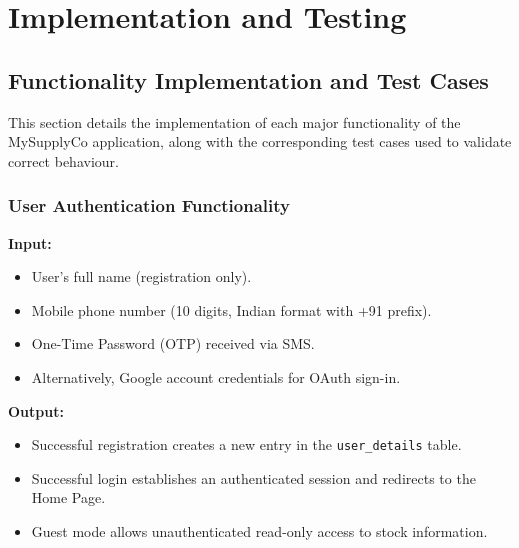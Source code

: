 \chapter{Implementation and Testing}

\section{Functionality Implementation and Test Cases}

This section details the implementation of each major functionality of the MySupplyCo application, along with the corresponding test cases used to validate correct behaviour.

\subsection{User Authentication Functionality}

\textbf{Input:}
\begin{itemize}
    \item User's full name (registration only).
    \item Mobile phone number (10 digits, Indian format with +91 prefix).
    \item One-Time Password (OTP) received via SMS.
    \item Alternatively, Google account credentials for OAuth sign-in.
\end{itemize}

\textbf{Output:}
\begin{itemize}
    \item Successful registration creates a new entry in the \texttt{user\_details} table.
    \item Successful login establishes an authenticated session and redirects to the Home Page.
    \item Guest mode allows unauthenticated read-only access to stock information.
\end{itemize}


